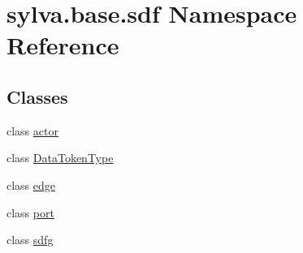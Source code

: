 \hypertarget{namespacesylva_1_1base_1_1sdf}{}\section{sylva.\+base.\+sdf Namespace Reference}
\label{namespacesylva_1_1base_1_1sdf}
\subsection*{Classes}
\begin{DoxyCompactItemize}
\item 
class \hyperlink{classsylva_1_1base_1_1sdf_1_1actor}{actor}
\item 
class \hyperlink{classsylva_1_1base_1_1sdf_1_1_data_token_type}{Data\+Token\+Type}
\item 
class \hyperlink{classsylva_1_1base_1_1sdf_1_1edge}{edge}
\item 
class \hyperlink{classsylva_1_1base_1_1sdf_1_1port}{port}
\item 
class \hyperlink{classsylva_1_1base_1_1sdf_1_1sdfg}{sdfg}
\end{DoxyCompactItemize}
